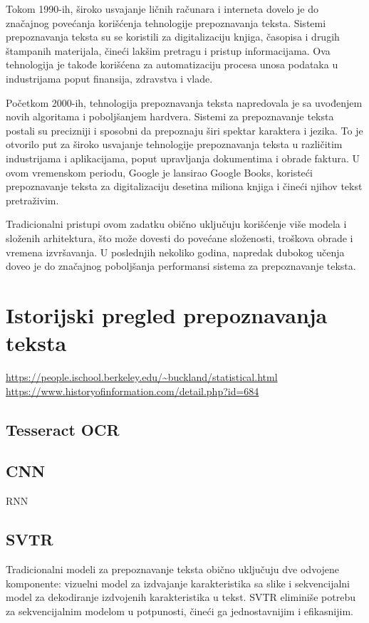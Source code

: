 \documentclass[a4paper,12pt]{article}
\begin{document}
	Tokom 1990-ih, široko usvajanje ličnih računara i interneta dovelo je do značajnog povećanja korišćenja tehnologije prepoznavanja teksta. Sistemi prepoznavanja teksta su se koristili za digitalizaciju knjiga, časopisa i drugih štampanih materijala, čineći lakšim pretragu i pristup informacijama. Ova tehnologija je takođe korišćena za automatizaciju procesa unosa podataka u industrijama poput finansija, zdravstva i vlade.
	
	Početkom 2000-ih, tehnologija prepoznavanja teksta napredovala je sa uvođenjem novih algoritama i poboljšanjem hardvera. Sistemi za prepoznavanje teksta postali su precizniji i sposobni da prepoznaju širi spektar karaktera i jezika. To je otvorilo put za široko usvajanje tehnologije prepoznavanja teksta u različitim industrijama i aplikacijama, poput upravljanja dokumentima i obrade faktura. U ovom vremenskom periodu, Google je lansirao Google Books, koristeći prepoznavanje teksta za digitalizaciju desetina miliona knjiga i čineći njihov tekst pretraživim.
	\newline
	
	Tradicionalni pristupi ovom zadatku obično uključuju korišćenje više modela i složenih arhitektura, što može dovesti do povećane složenosti, troškova obrade i vremena izvršavanja. U poslednjih nekoliko godina, napredak dubokog učenja doveo je do značajnog poboljšanja performansi sistema za prepoznavanje teksta.
	\newpage
	
	\section{Istorijski pregled prepoznavanja teksta}
	\url{https://people.ischool.berkeley.edu/~buckland/statistical.html}
	\newline
	\url{https://www.historyofinformation.com/detail.php?id=684}
	\subsection{Tesseract OCR}
	\subsection{CNN}
	RNN
	\subsection{SVTR}
	Tradicionalni modeli za prepoznavanje teksta obično uključuju dve odvojene komponente: vizuelni model za izdvajanje karakteristika sa slike i sekvencijalni model za dekodiranje izdvojenih karakteristika u tekst. SVTR eliminiše potrebu za sekvencijalnim modelom u potpunosti, čineći ga jednostavnijim i efikasnijim.
	
\end{document}
